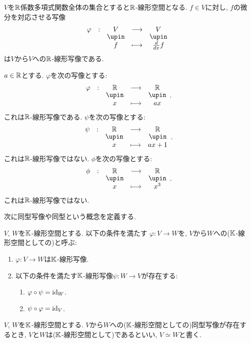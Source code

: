 \begin{example}
$V$を$\mathbb{R}$係数多項式関数全体の集合とすると$\mathbb{R}$-線形空間となる.
$f\in V$に対し, $f$の微分を対応させる写像
\begin{align*}
\shazo{\varphi}{V}{V}
{f}{\frac{d}{dx}f}
\end{align*}
は$V$から$V$への$\mathbb{R}$-線形写像である.
\end{example}


\begin{example}
  $a\in\mathbb{R}$とする.
  $\varphi$を次の写像とする:
  \begin{align*}
    \shazo{\varphi}{\RR}{\RR}{x}{ax}.
  \end{align*}
  これは$\mathbb{R}$-線形写像である.
  $\psi$を次の写像とする:
  \begin{align*}
    \shazo{\psi}{\RR}{\RR}{x}{ax+1}.
  \end{align*}
  これは$\mathbb{R}$-線形写像ではない.
  $\phi$を次の写像とする:
  \begin{align*}
    \shazo{\phi}{\RR}{\RR}{x}{x^3}.
  \end{align*}
  これは$\mathbb{R}$-線形写像ではない.
\end{example}


次に同型写像や同型という概念を定義する.
\begin{definition}
  $V$, $W$を$\mathbb{K}$-線形空間とする.
  以下の条件を満たす
  $\varphi\colon V\to W$を,
  $V$から$W$への($\mathbb{K}$-線形空間としての)と呼ぶ:
  \begin{enumerate}
  \item $\varphi\colon V\to W$は$\mathbb{K}$-線形写像.
  \item 以下の条件を満たす$\mathbb{K}$-線形写像$\psi\colon W \to V$が存在する:
    \begin{enumerate}
      \item $\varphi\circ \psi=\operatorname{id}_W$.
      \item $\psi\circ \varphi=\operatorname{id}_V$.
    \end{enumerate}
  \end{enumerate}
\end{definition}
\begin{definition}
  $V$, $W$を$\mathbb{K}$-線形空間とする.
  $V$から$W$への($\mathbb{K}$-線形空間としての)同型写像が存在するとき,
  $V$と$W$は($\mathbb{K}$-線形空間として)であるといい,  
  $V\simeq W$と書く.
\end{definition}

